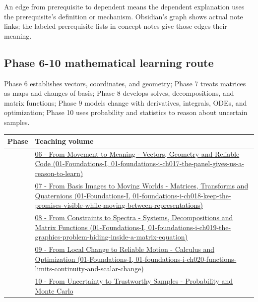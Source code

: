 An edge from prerequisite to dependent means the dependent explanation uses the prerequisite's definition or mechanism. Obsidian's graph shows actual note links; the labeled prerequisite lists in concept notes give those edges their meaning.

\subsection{Phase 6-10 mathematical learning route}\label{appendix-4ad47bdd269a-phase-6-10-mathematical-learning-route}

Phase 6 establishes vectors, coordinates, and geometry; Phase 7 treats matrices as maps and changes of basis; Phase 8 develops solves, decompositions, and matrix functions; Phase 9 models change with derivatives, integrals, ODEs, and optimization; Phase 10 uses probability and statistics to reason about uncertain samples.

{\def\LTcaptype{none} %
\begin{longtable}[]{@{}
  >{\raggedright\arraybackslash}p{}
  >{\raggedright\arraybackslash}p{}@{}}
\toprule\noalign{}
\begin{minipage}[b]{\linewidth}\raggedright
Phase
\end{minipage} & \begin{minipage}[b]{\linewidth}\raggedright
Teaching volume
\end{minipage} \\
\midrule\noalign{}
\endhead
\bottomrule\noalign{}
\endlastfoot
6 & \href{../01-Foundations-I/main.pdf\#nameddest=01-foundations-i-ch017-the-panel-gives-us-a-reason-to-learn}{06 - From Movement to Meaning - Vectors, Geometry and Reliable Code (01-Foundations-I, 01-foundations-i-ch017-the-panel-gives-us-a-reason-to-learn)} \\
7 & \href{../01-Foundations-I/main.pdf\#nameddest=01-foundations-i-ch018-keep-the-promises-visible-while-moving-between-representations}{07 - From Basis Images to Moving Worlds - Matrices, Transforms and Quaternions (01-Foundations-I, 01-foundations-i-ch018-keep-the-promises-visible-while-moving-between-representations)} \\
8 & \href{../01-Foundations-I/main.pdf\#nameddest=01-foundations-i-ch019-the-graphics-problem-hiding-inside-a-matrix-equation}{08 - From Constraints to Spectra - Systems, Decompositions and Matrix Functions (01-Foundations-I, 01-foundations-i-ch019-the-graphics-problem-hiding-inside-a-matrix-equation)} \\
9 & \href{../01-Foundations-I/main.pdf\#nameddest=01-foundations-i-ch020-functions-limits-continuity-and-scalar-change}{09 - From Local Change to Reliable Motion - Calculus and Optimization (01-Foundations-I, 01-foundations-i-ch020-functions-limits-continuity-and-scalar-change)} \\
10 & \hyperref[02-foundations-ii-ch039-learning-route]{10 - From Uncertainty to Trustworthy Samples - Probability and Monte Carlo} \\
\end{longtable}
}

